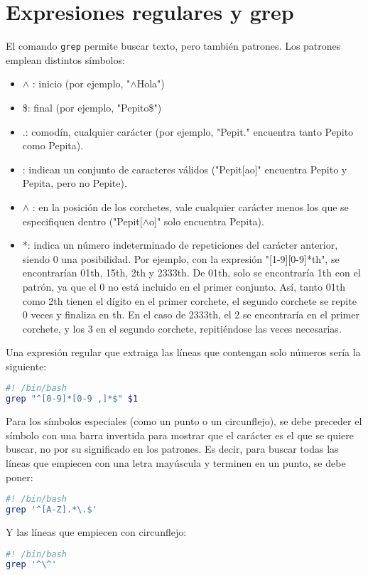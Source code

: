 \section{Expresiones regulares y grep}
El comando \texttt{grep} permite buscar texto, pero también patrones. Los patrones emplean distintos símbolos:
\begin{itemize}
\item $\wedge$ : inicio (por ejemplo, "$\wedge$Hola")
\item \$: final (por ejemplo, "Pepito\$")
\item .: comodín, cualquier carácter (por ejemplo, "Pepit." encuentra tanto Pepito como Pepita).
\item \lbrack \rbrack: indican un conjunto de caracteres válidos ("Pepit[ao]" encuentra Pepito y Pepita, pero no Pepite).
\item \lbrack  $\wedge$ \rbrack : en la posición de los corchetes, vale cualquier carácter menos los que se especifiquen dentro ("Pepit[$\wedge$o]" solo encuentra Pepita).
\item *: indica un número indeterminado de repeticiones del carácter anterior, siendo 0 una posibilidad. Por ejemplo, con la expresión "[1-9][0-9]*th", se encontrarían 01th, 15th, 2th y 2333th. De 01th, solo se encontraría 1th con el patrón, ya que el 0 no está incluido en el primer conjunto. Así, tanto 01th como 2th tienen el dígito en el primer corchete, el segundo corchete se repite 0 veces y finaliza en th. En el caso de 2333th, el 2 se encontraría en el primer corchete, y los 3 en el segundo corchete, repitiéndose las veces necesarias. 
\end{itemize} 

Una expresión regular que extraiga las líneas que contengan solo números sería la siguiente:
\begin{lstlisting}[language=bash]
#! /bin/bash
grep "^[0-9]*[0-9 ,]*$" $1
\end{lstlisting}

Para los símbolos especiales (como un punto o un circunflejo), se debe preceder el símbolo con una barra invertida para mostrar que el carácter es el que se quiere buscar, no por su significado en los patrones. Es decir, para buscar todas las líneas que empiecen con una letra mayúscula y terminen en un punto, se debe poner:
\begin{lstlisting}[language=bash]
#! /bin/bash
grep '^[A-Z].*\.$'
\end{lstlisting}

Y las líneas que empiecen con circunflejo:
\begin{lstlisting}[language=bash]
#! /bin/bash
grep '^\^' 
\end{lstlisting}

